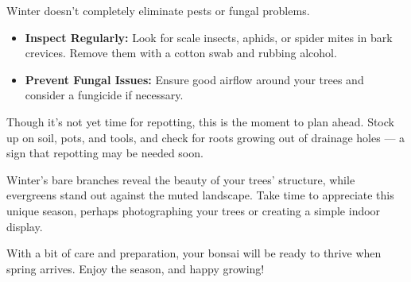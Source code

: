 \noindent
Winter doesn't completely eliminate pests or fungal problems.

\begin{itemize}
    \item \textbf{Inspect Regularly:} Look for scale insects, aphids, or spider mites in bark crevices.
    Remove them with a cotton swab and rubbing alcohol.

    \item \textbf{Prevent Fungal Issues:} Ensure good airflow around your trees and consider a fungicide if necessary.
\end{itemize}

\noindent
Though it's not yet time for repotting, this is the moment to plan ahead.
Stock up on soil, pots, and tools, and check for roots growing out of drainage holes --- a sign that repotting may be needed soon.

\noindent
Winter's bare branches reveal the beauty of your trees' structure, while evergreens stand out against the muted landscape.
Take time to appreciate this unique season, perhaps photographing your trees or creating a simple indoor display.

With a bit of care and preparation, your bonsai will be ready to thrive when spring arrives.
Enjoy the season, and happy growing!
\closearticle
